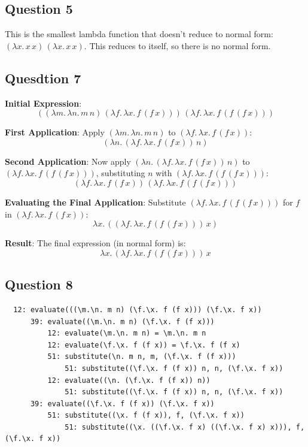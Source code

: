 \documentclass{article}
\theoremstyle{plain}
\theoremstyle{definition}
\theoremstyle{remark}
\begin{document}
\subsection{Question 5}

This is the smallest lambda function that doesn’t reduce to normal form: \((\lambda x. \, x \, x) \, (\lambda x. \, x \, x)\). This reduces to itself, so there is no normal form.

\subsection{Quesdtion 7}

\textbf{Initial Expression}:
\[
((\lambda m.\, \lambda n.\, m \, n) \, (\lambda f.\, \lambda x.\, f \, (f \, x))) \, (\lambda f.\, \lambda x.\, f \, (f \, (f \, x)))
\]

\textbf{First Application}:
Apply \((\lambda m.\, \lambda n.\, m \, n)\) to \((\lambda f.\, \lambda x.\, f \, (f \, x))\):
\[
(\lambda n.\, (\lambda f.\, \lambda x.\, f \, (f \, x)) \, n)
\]

\textbf{Second Application}:
Now apply \((\lambda n.\, (\lambda f.\, \lambda x.\, f \, (f \, x)) \, n)\) to \((\lambda f.\, \lambda x.\, f \, (f \, (f \, x)))\), substituting \(n\) with \((\lambda f.\, \lambda x.\, f \, (f \, (f \, x)))\):
\[
(\lambda f.\, \lambda x.\, f \, (f \, x)) \, (\lambda f.\, \lambda x.\, f \, (f \, (f \, x)))
\]

\textbf{Evaluating the Final Application}:
Substitute \((\lambda f.\, \lambda x.\, f \, (f \, (f \, x)))\) for \(f\) in \((\lambda f.\, \lambda x.\, f \, (f \, x))\):
\[
\lambda x.\, ((\lambda f.\, \lambda x.\, f \, (f \, (f \, x))) \, x)
\]

\textbf{Result}:
The final expression (in normal form) is:
\[
\lambda x.\, (\lambda f.\, \lambda x.\, f \, (f \, (f \, x))) \, x
\]

\subsection{Question 8}

\begin{verbatim}
  12: evaluate(((\m.\n. m n) (\f.\x. f (f x))) (\f.\x. f x))
      39: evaluate((\m.\n. m n) (\f.\x. f (f x)))
          12: evaluate(\m.\n. m n) = \m.\n. m n
          12: evaluate(\f.\x. f (f x)) = \f.\x. f (f x)
          51: substitute(\n. m n, m, (\f.\x. f (f x)))
              51: substitute((\f.\x. f (f x)) n, n, (\f.\x. f x))
          12: evaluate((\n. (\f.\x. f (f x)) n))
              51: substitute((\f.\x. f (f x)) n, n, (\f.\x. f x))
      39: evaluate((\f.\x. f (f x)) (\f.\x. f x))
          51: substitute((\x. f (f x)), f, (\f.\x. f x))
              51: substitute((\x. ((\f.\x. f x) ((\f.\x. f x) x))), f, (\f.\x. f x))
  \end{verbatim}
\end{document}
